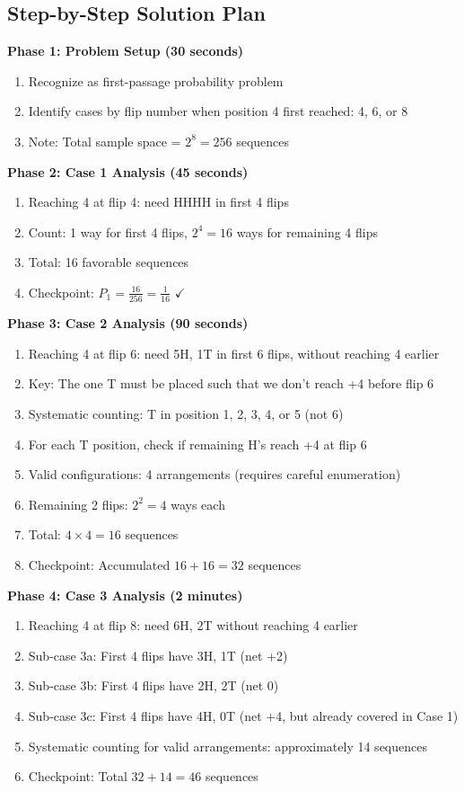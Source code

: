 \documentclass[]{article}
\begin{document}
\begin{solutionbox}
\subsection*{Step-by-Step Solution Plan}

\textbf{Phase 1: Problem Setup (30 seconds)}
\begin{enumerate}
    \item Recognize as first-passage probability problem
    \item Identify cases by flip number when position 4 first reached: 4, 6, or 8
    \item Note: Total sample space = $2^8 = 256$ sequences
\end{enumerate}

\textbf{Phase 2: Case 1 Analysis (45 seconds)}
\begin{enumerate}
    \item Reaching 4 at flip 4: need HHHH in first 4 flips
    \item Count: 1 way for first 4 flips, $2^4 = 16$ ways for remaining 4 flips
    \item Total: 16 favorable sequences
    \item Checkpoint: $P_1 = \frac{16}{256} = \frac{1}{16}$ $\checkmark$
\end{enumerate}

\textbf{Phase 3: Case 2 Analysis (90 seconds)}
\begin{enumerate}
    \item Reaching 4 at flip 6: need 5H, 1T in first 6 flips, without reaching 4 earlier
    \item Key: The one T must be placed such that we don't reach +4 before flip 6
    \item Systematic counting: T in position 1, 2, 3, 4, or 5 (not 6)
    \item For each T position, check if remaining H's reach +4 at flip 6
    \item Valid configurations: 4 arrangements (requires careful enumeration)
    \item Remaining 2 flips: $2^2 = 4$ ways each
    \item Total: $4 \times 4 = 16$ sequences
    \item Checkpoint: Accumulated $16 + 16 = 32$ sequences
\end{enumerate}

\textbf{Phase 4: Case 3 Analysis (2 minutes)}
\begin{enumerate}
    \item Reaching 4 at flip 8: need 6H, 2T without reaching 4 earlier
    \item Sub-case 3a: First 4 flips have 3H, 1T (net +2)
    \item Sub-case 3b: First 4 flips have 2H, 2T (net 0)
    \item Sub-case 3c: First 4 flips have 4H, 0T (net +4, but already covered in Case 1)
    \item Systematic counting for valid arrangements: approximately 14 sequences
    \item Checkpoint: Total $32 + 14 = 46$ sequences
\end{enumerate}


\end{solutionbox}
\end{document}
